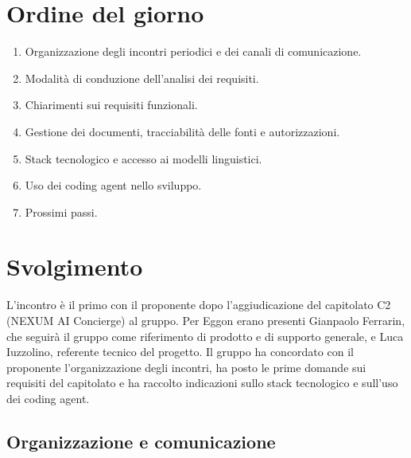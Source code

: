 \section{Ordine del giorno}
\begin{enumerate}
  \item Organizzazione degli incontri periodici e dei canali di comunicazione.
  \item Modalità di conduzione dell'analisi dei requisiti.
  \item Chiarimenti sui requisiti funzionali.
  \item Gestione dei documenti, tracciabilità delle fonti e autorizzazioni.
  \item Stack tecnologico e accesso ai modelli linguistici.
  \item Uso dei coding agent nello sviluppo.
  \item Prossimi passi.
\end{enumerate}

\section{Svolgimento}
L'incontro è il primo con il proponente dopo l'aggiudicazione del capitolato C2 (NEXUM AI Concierge) al gruppo. Per Eggon erano presenti Gianpaolo Ferrarin, che seguirà il gruppo come riferimento di prodotto e di supporto generale, e Luca Iuzzolino, referente tecnico del progetto. Il gruppo ha concordato con il proponente l'organizzazione degli incontri, ha posto le prime domande sui requisiti del capitolato e ha raccolto indicazioni sullo stack tecnologico e sull'uso dei coding agent.

\subsection{Organizzazione e comunicazione}



